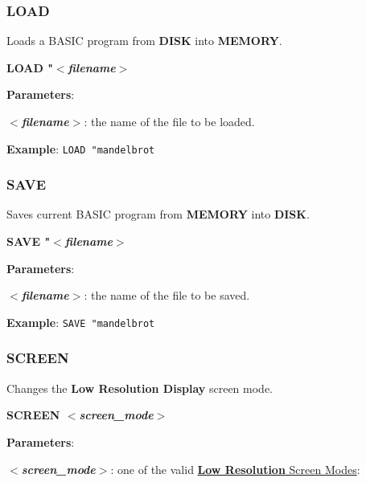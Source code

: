         \subsubsection{{LOAD}}
        Loads a BASIC program from \textbf{DISK} into \textbf{MEMORY}.

        \hspace{1.9cm}\textbf{LOAD "\textit{$<$filename$>$}}

        \textbf{Parameters}:

        \hspace{1cm}\textbf{\textit{$<$filename$>$}}: the name of the file to be
        loaded.

        \textbf{Example}: \texttt{LOAD "mandelbrot}

        \subsubsection{{SAVE}}
        Saves current BASIC program from \textbf{MEMORY} into \textbf{DISK}.

        \hspace{1.9cm}\textbf{SAVE "\textit{$<$filename$>$}}

        \textbf{Parameters}:

        \hspace{1cm}\textbf{\textit{$<$filename$>$}}: the name of the file to be
        saved.

        \textbf{Example}: \texttt{SAVE "mandelbrot}

        \subsubsection{{SCREEN}}
        Changes the \textbf{Low Resolution Display} screen mode.

        \hspace{1.9cm}\textbf{SCREEN \textit{$<$screen\_mode$>$}}

        \textbf{Parameters}:

        \hspace{1cm}\textbf{\textit{$<$screen\_mode$>$}}: one of the valid
        \hyperref[sec:vdpscrmodes]{\textbf{Low Resolution} Screen Modes}:

